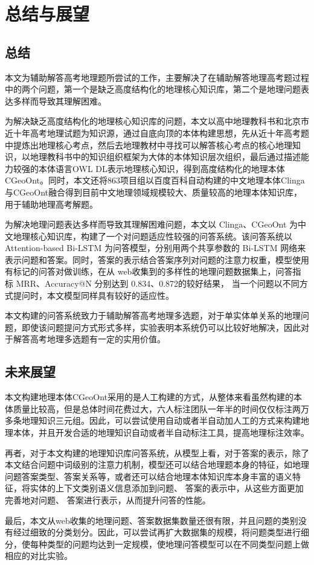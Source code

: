 \chapter{总结与展望}
\section{总结}
本文为辅助解答高考地理题所尝试的工作，主要解决了在辅助解答地理高考题过程中的两个问题，第一个是缺乏高度结构化的地理核心知识库，第二个是地理问题表达多样而导致其理解困难。

为解决缺乏高度结构化的地理核心知识库的问题，本文以高中地理教科书和北京市近十年高考地理试题为知识源，通过自底向顶的本体构建思想，先从近十年高考题中提炼出地理核心考点，然后去地理教材中寻找可以解答核心考点的核心地理知识，以地理教科书中的知识组织框架为大体的本体知识层次组织，最后通过描述能力较强的本体语言OWL DL表示地理核心知识，得到高度结构化的地理本体CGeoOnt。同时，本文还将863项目组以百度百科自动构建的中文地理本体Clinga与CGeoOnt融合得到目前中文地理领域规模较大、质量较高的地理本体知识库，用于辅助地理高考解题。

为解决地理问题表达多样而导致其理解困难问题，本文以 Clinga、CGeoOnt 为中文地理核心知识库，构建了一个对问题适应性较强的问答系统。该问答系统以 Attention-based Bi-LSTM 为问答模型，分别用两个共享参数的 Bi-LSTM 网络来表示问题和答案。同时，答案的表示结合答案序列对问题的注意力权重，模型使用有标记的问答对做训练，在从 web收集到的多样性的地理问题数据集上，问答指标 MRR、Accuracy@N 分别达到 0.834、0.872的较好结果， 当一个问题以不同方式提问时，本文模型同样具有较好的适应性。

本文构建的问答系统致力于辅助解答高考地理多选题，对于单实体单关系的地理问题，即使该问题提问方式形式多样，实验表明本系统仍可以比较好地解决，因此对于解答高考地理多选题有一定的实用价值。

\section{未来展望}
本文构建地理本体CGeoOnt采用的是人工构建的方式，从整体来看虽然构建的本体质量比较高，但是总体时间花费过大，六人标注团队一年半的时间仅仅标注两万多条地理知识三元组。因此，可以尝试使用自动或者半自动加人工的方式来构建地理本体，并且开发合适的地理知识自动或者半自动标注工具，提高地理标注效率。

再者，对于本文构建的地理知识库问答系统，从模型上看，对于答案的表示，除了本文结合问题中词级别的注意力机制，模型还可以结合地理题本身的特征，如地理问题答案类型、答案关系等，或者还可以结合地理本体知识库本身丰富的语义特征，将实体的上下文类别语义信息添加到问题、 答案的表示中，从这些方面更加完善地对问题、 答案进行表示，从而提升问答的性能。

最后，本文从web收集的地理问题、答案数据集数量还很有限，并且问题的类别没有经过细致的分类划分。因此，可以尝试再扩大数据集的规模，将问题类型进行细分，使每种类型的问题均达到一定规模，使地理问答模型可以在不同类型问题上做相应的对比实验。
